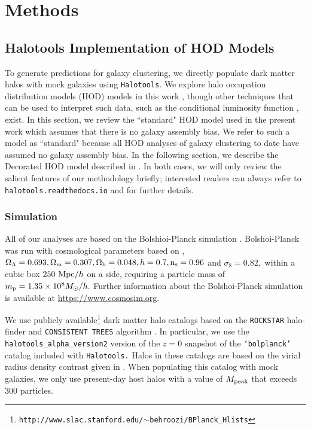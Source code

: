 \documentclass[usenatbib,usegraphicx,letterpaper]{mn2e}
\begin{document}
\section{Methods}
\label{section:methods}

\subsection{Halotools Implementation of HOD Models}
\label{subsection:halotools}

To generate predictions for galaxy clustering, we directly populate dark matter halos with mock galaxies using {\tt Halotools}. 
We explore halo occupation distribution models (HOD) models in this work 
\citep[e.g.][]{seljak00,ma_fry00,scoccimarro01a,berlind02}, though other 
techniques that can be used to interpret such data, such as the conditional luminosity function 
\citep[CLF, e.g.,][]{yang03,vdBosch13}, exist. In this section, we review the ``standard" HOD 
model used in the present work which assumes that there is no galaxy assembly bias. We refer to 
such a model as ``standard" because all HOD analyses of galaxy clustering to date have assumed no 
galaxy assembly bias. In the following section, we describe 
the Decorated HOD model described in \citet{hearin_etal16}. In both cases, we will only 
review the salient features of our methodology briefly; 
interested readers can always refer to {\tt halotools.readthedocs.io} and 
\citet{hearin_etal16} for further details. 

\subsubsection{Simulation}

All of our analyses are based on the Bolshioi-Planck simulation \citep{riebe_etal11}. 
Bolshoi-Planck was run with cosmological parameters based on \citet{planck13}, $\Omega_{\Lambda} = 0.693, \Omega_{\rm m} = 0.307, \Omega_{\rm b} = 0.048, h = 0.7, {\rm n_s}=0.96$ and $\sigma_8 = 0.82,$ within a cubic box 
$250$ ${\rm Mpc}/h$ on a side, requiring a particle mass of $m_{\rm p} = 1.35\times10^{8}M_{\odot}/h.$ 
Further information about the Bolshoi-Planck simulation is available at \url{https://www.cosmosim.org}. 

We use publicly available\footnote{\tt http://www.slac.stanford.edu/$\sim$behroozi/BPlanck\_Hlists} dark matter 
halo catalogs based on the {\tt ROCKSTAR} halo-finder \citep{behroozi_rockstar11} and {\tt CONSISTENT TREES} algorithm \citep{behroozi_trees13}. In particular, we use the {\tt halotools\_alpha\_version2} version of the $z=0$ snapshot 
of the {\tt `bolplanck'} catalog included with {\tt Halotools.} Halos in these catalogs are based on the virial radius 
density contrast given in \citet{bryan_norman98}. When populating this catalog with mock galaxies, we only use 
present-day host halos with a value of $M_{\rm peak}$ that exceeds $300$ particles. 
\end{document}
